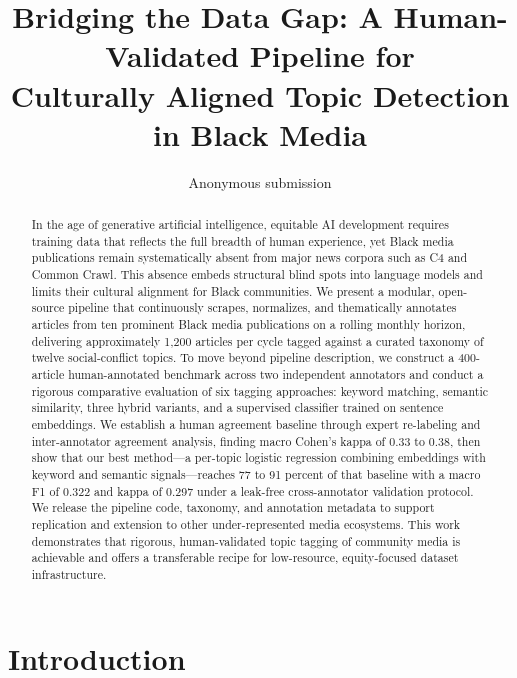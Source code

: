 \documentclass[letterpaper,twocolumn,10pt]{article}
\begin{document}
\title{Bridging the Data Gap: A Human-Validated Pipeline for\\
Culturally Aligned Topic Detection in Black Media}

\author{Anonymous submission}


\maketitle

\begin{abstract}
In the age of generative artificial intelligence, equitable AI development
requires training data that reflects the full breadth of human experience,
yet Black media publications remain systematically absent from major news
corpora such as C4 and Common Crawl. This absence embeds structural blind
spots into language models and limits their cultural alignment for Black
communities. We present a modular, open-source pipeline that continuously
scrapes, normalizes, and thematically annotates articles from ten prominent
Black media publications on a rolling monthly horizon, delivering
approximately 1,200 articles per cycle tagged against a curated taxonomy of
twelve social-conflict topics. To move beyond pipeline description, we
construct a 400-article human-annotated benchmark across two independent
annotators and conduct a rigorous comparative evaluation of six tagging
approaches: keyword matching, semantic similarity, three hybrid variants,
and a supervised classifier trained on sentence embeddings. We establish a
human agreement baseline through expert re-labeling and inter-annotator
agreement analysis, finding macro Cohen's kappa of 0.33 to 0.38, then show
that our best method---a per-topic logistic regression combining embeddings
with keyword and semantic signals---reaches 77 to 91 percent of that
baseline with a macro F1 of 0.322 and kappa of 0.297 under a leak-free
cross-annotator validation protocol. We release the pipeline code, taxonomy,
and annotation metadata to support replication and extension to other
under-represented media ecosystems. This work demonstrates that rigorous,
human-validated topic tagging of community media is achievable and offers a
transferable recipe for low-resource, equity-focused dataset infrastructure.
\end{abstract}

\section{Introduction}
\end{document}
